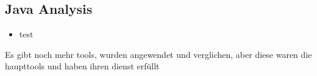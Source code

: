 \subsection{Java Analysis} \label{subsection:forensics-tools-java}





\begin{itemize}
    \item test
\end{itemize}
Es gibt noch mehr tools, wurden angewendet und verglichen, aber diese waren die haupttools und haben ihren dienst erfüllt

